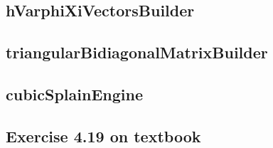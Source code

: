 \subsection{hVarphiXiVectorsBuilder}
\label{subsec:hVarphiXiVectorsBuilder}


\subsection{triangularBidiagonalMatrixBuilder}
\label{subsec:triangularBidiagonalMatrixBuilder}


\subsection{cubicSplainEngine}
\label{subsec:cubicSplainEngine}


\subsection{Exercise 4.19 on textbook}
\label{subsec:exercise419}
